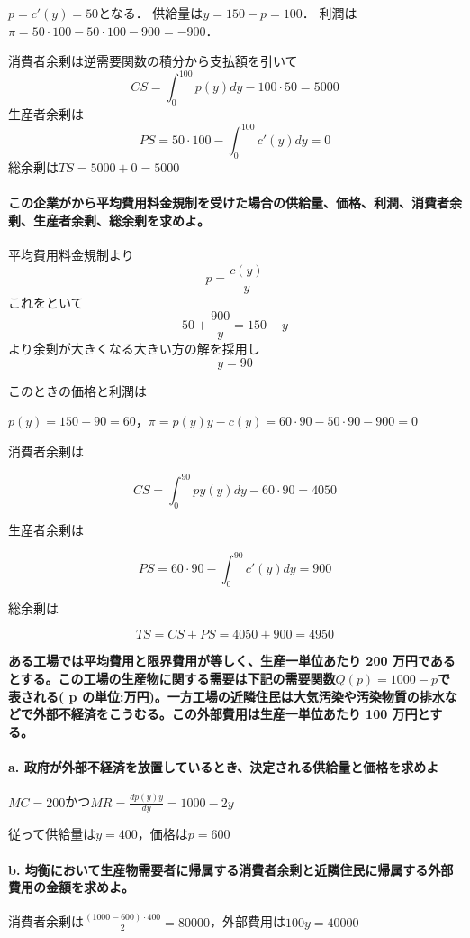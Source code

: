 \documentclass{jsarticle}
\begin{document}
$p=c'(y)=50$となる．
供給量は$y=150-p=100$．
利潤は$\pi=50\cdot100-50\cdot100-900=-900$．

消費者余剰は逆需要関数の積分から支払額を引いて
$$CS=\int_0^{100} p(y) dy - 100\cdot 50=5000$$
生産者余剰は
$$PS=50 \cdot 100 - \int_0^{100} c'(y) dy =0$$
総余剰は$TS=5000+0=5000$

\paragraph{この企業がから平均費用料金規制を受けた場合の供給量、価格、利潤、消費者余剰、生産者余剰、総余剰を求めよ。}

平均費用料金規制より
$$p=\frac{c(y)}{y}$$
これをといて
$$50+\frac{900}{y}=150-y$$
より余剰が大きくなる大きい方の解を採用し
$$y=90$$

このときの価格と利潤は

$p(y)=150-90=60$，$\pi=p(y)y-c(y)=60\cdot90-50\cdot90-900=0$

消費者余剰は

$$CS=\int_0^{90}py(y)dy-60\cdot90=4050$$

生産者余剰は

$$PS=60\cdot90-\int_0^{90}c'(y)dy=900$$

総余剰は

$$TS=CS+PS=4050+900=4950$$

\textbf{ある工場では平均費用と限界費用が等しく、生産一単位あたり 200 万円であるとする。この工場の生産物に関する需要は下記の需要関数$Q( p) =1000 − p$で表される( p の単位:万円)。一方工場の近隣住民は大気汚染や汚染物質の排水などで外部不経済をこうむる。この外部費用は生産一単位あたり 100 万円とする。}

\paragraph{a. 政府が外部不経済を放置しているとき、決定される供給量と価格を求めよ}

$MC=200$かつ$MR=\frac{d p(y)y}{dy}=1000-2y$

従って供給量は$y=400$，価格は$p=600$

\paragraph{b. 均衡において生産物需要者に帰属する消費者余剰と近隣住民に帰属する外部費用の金額を求めよ。}

消費者余剰は$\frac{(1000-600)\cdot400}{2}=80000$，外部費用は$100y=40000$
\end{document}
